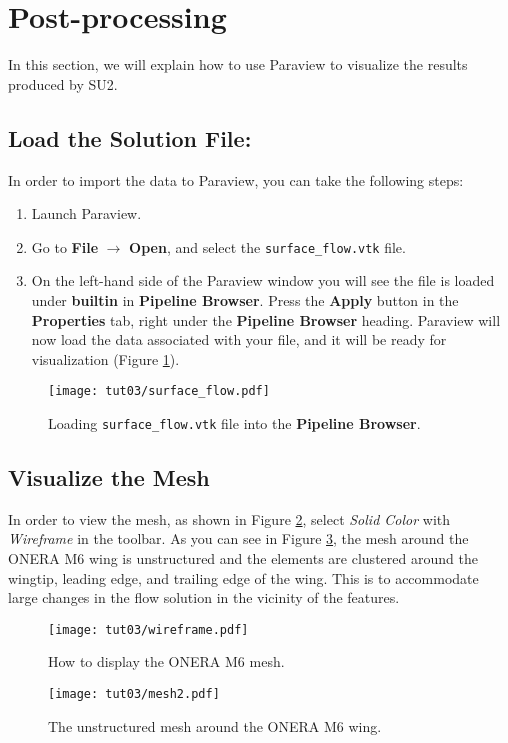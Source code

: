 \section*{Post-processing}
In this section, we will explain how to use Paraview to visualize the results produced by SU2.
\subsection{Load the Solution File:}
In order to import the data to Paraview, you can take the following steps:
\begin{enumerate}[label=\arabic*)]
	\item Launch Paraview.
	\item Go to \textbf{File} $\rightarrow$ \textbf{Open}, and select the \texttt{surface\_flow.vtk} file.
	\item On the left-hand side of the Paraview window you will see the file is loaded under \textbf{builtin} in \textbf{Pipeline Browser}. Press the \textbf{Apply} button in the \textbf{Properties} tab, right under the \textbf{Pipeline Browser} heading. Paraview will now load the data associated with your file, and it will be ready for visualization (Figure \ref{fig3:load}).
\end{enumerate}
 
\begin{figure}[ht]
    \centering
    \texttt{[image: tut03/surface\_flow.pdf]}
    \caption{Loading \texttt{surface\_flow.vtk} file into the \textbf{Pipeline Browser}.}
    \label{fig3:load}
\end{figure}
\subsection{Visualize the Mesh}
In order to view the mesh, as shown in Figure \ref{fig3:wireframe}, select \textit{Solid Color} with \textit{Wireframe} in the toolbar. As you can see in Figure \ref{fig3:mesh}, the mesh around the ONERA M6 wing is unstructured and the elements are clustered around the wingtip, leading edge, and trailing edge of the wing. This is to accommodate large changes in the flow solution in the vicinity of the features.
\begin{figure}[ht]
    \centering
    \texttt{[image: tut03/wireframe.pdf]}
    \caption{How to display the ONERA M6 mesh.}
    \label{fig3:wireframe}
\end{figure}
\begin{figure}[ht]
    \centering
    \texttt{[image: tut03/mesh2.pdf]}
    \caption{The unstructured mesh around the ONERA M6 wing.}
    \label{fig3:mesh}
\end{figure}

